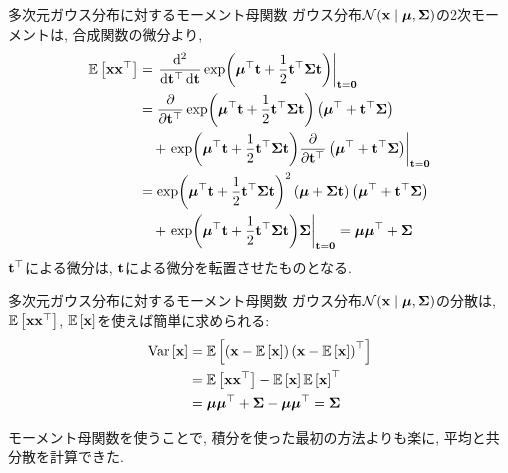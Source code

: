 \documentclass[dvipdfmx,notheorems,t]{beamer}
\begin{document}
\begin{frame}{多次元ガウス分布に対するモーメント母関数}
ガウス分布$\mathcal{N}(\vb{x} \mid \vb*{\mu}, \vb{\Sigma})$の2次モーメントは, 合成関数の微分より,
\begin{align*}
  \operatorname{\mathbb{E}} \left[ \vb{x} \vb{x}^\top \right]
  &= \left. \frac{\dd[2]}{\dd{\vb{t}^\top} \dd{\vb{t}}}
    \exp(\vb*{\mu}^\top \vb{t} + \frac{1}{2} \vb{t}^\top \vb{\Sigma} \vb{t})
    \right|_{\vb{t} = \vb{0}} \\
  &= \pdv{\vb{t}^\top} \exp(\vb*{\mu}^\top \vb{t} + \frac{1}{2} \vb{t}^\top \vb{\Sigma} \vb{t})
    \left( \vb*{\mu}^\top + \vb{t}^\top \vb{\Sigma} \right) \\
  & \quad + \left. \exp(\vb*{\mu}^\top \vb{t} + \frac{1}{2} \vb{t}^\top \vb{\Sigma} \vb{t})
    \pdv{\vb{t}^\top} \left( \vb*{\mu}^\top + \vb{t}^\top \vb{\Sigma} \right)
    \right|_{\vb{t} = \vb{0}} \\
  &= \exp(\vb*{\mu}^\top \vb{t} + \frac{1}{2} \vb{t}^\top \vb{\Sigma} \vb{t})^2
    \left( \vb*{\mu} + \vb{\Sigma} \vb{t} \right)
    \left( \vb*{\mu}^\top + \vb{t}^\top \vb{\Sigma} \right) \\
  & \quad + \left. \exp(\vb*{\mu}^\top \vb{t} + \frac{1}{2} \vb{t}^\top \vb{\Sigma} \vb{t})
    \vb{\Sigma} \right|_{\vb{t} = \vb{0}}
  = \vb*{\mu} \vb*{\mu}^\top + \vb{\Sigma}
\end{align*}
$\vb{t}^\top$による微分は, $\vb{t}$による微分を転置させたものとなる.
\end{frame}

\begin{frame}{多次元ガウス分布に対するモーメント母関数}
ガウス分布$\mathcal{N}(\vb{x} \mid \vb*{\mu}, \vb{\Sigma})$の分散は,
$\operatorname{\mathbb{E}} \left[ \vb{x} \vb{x}^\top \right]$, $\operatorname{\mathbb{E}} \left[ \vb{x} \right]$を使えば簡単に求められる:
\begin{align*}
  \operatorname{Var} \left[ \vb{x} \right] &= \operatorname{\mathbb{E}} \left[ \left( \vb{x} - \operatorname{\mathbb{E}} \left[ \vb{x} \right] \right) \left( \vb{x} - \operatorname{\mathbb{E}} \left[ \vb{x} \right] \right)^\top \right] \\
  &= \operatorname{\mathbb{E}} \left[ \vb{x} \vb{x}^\top \right] - \operatorname{\mathbb{E}} \left[ \vb{x} \right] \operatorname{\mathbb{E}} \left[ \vb{x} \right]^\top \\
  &= \vb*{\mu} \vb*{\mu}^\top + \vb{\Sigma} - \vb*{\mu} \vb*{\mu}^\top = \vb{\Sigma}
\end{align*}

モーメント母関数を使うことで, 積分を使った最初の方法よりも楽に, 平均と共分散を計算できた.
\end{frame}
\end{document}
